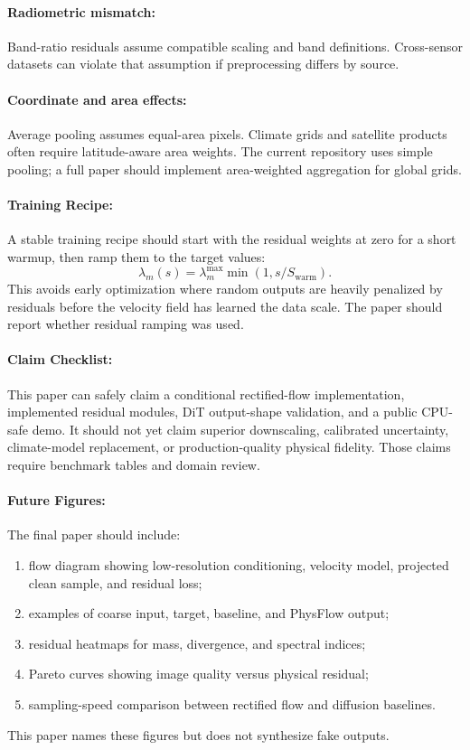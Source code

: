 \documentclass{article}
\begin{document}
\paragraph{Radiometric mismatch:}
Band-ratio residuals assume compatible scaling and band definitions. Cross-sensor datasets can violate that assumption if preprocessing differs by source.

\paragraph{Coordinate and area effects:}
Average pooling assumes equal-area pixels. Climate grids and satellite products often require latitude-aware area weights. The current repository uses simple pooling; a full paper should implement area-weighted aggregation for global grids.

\paragraph{Training Recipe:}

A stable training recipe should start with the residual weights at zero for a short warmup, then ramp them to the target values:
\begin{equation}
  \lambda_m(s)=\lambda_m^{\max}\min(1,s/S_{\text{warm}}).
\end{equation}
This avoids early optimization where random outputs are heavily penalized by residuals before the velocity field has learned the data scale. The paper should report whether residual ramping was used.

\paragraph{Claim Checklist:}

This paper can safely claim a conditional rectified-flow implementation, implemented residual modules, DiT output-shape validation, and a public CPU-safe demo. It should not yet claim superior downscaling, calibrated uncertainty, climate-model replacement, or production-quality physical fidelity. Those claims require benchmark tables and domain review.

\paragraph{Future Figures:}

The final paper should include:
\begin{enumerate}
  \item flow diagram showing low-resolution conditioning, velocity model, projected clean sample, and residual loss;
  \item examples of coarse input, target, baseline, and PhysFlow output;
  \item residual heatmaps for mass, divergence, and spectral indices;
  \item Pareto curves showing image quality versus physical residual;
  \item sampling-speed comparison between rectified flow and diffusion baselines.
\end{enumerate}
This paper names these figures but does not synthesize fake outputs.
\end{document}
